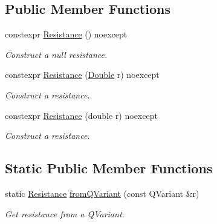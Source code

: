 \subsection*{Public Member Functions}
\begin{DoxyCompactItemize}
\item 
constexpr \hyperlink{class_mdt_1_1_numeric_1_1_resistance_ad1f9115eeae7bb01b54e79d036b2c6f9}{Resistance} () noexcept\hypertarget{class_mdt_1_1_numeric_1_1_resistance_ad1f9115eeae7bb01b54e79d036b2c6f9}{}\label{class_mdt_1_1_numeric_1_1_resistance_ad1f9115eeae7bb01b54e79d036b2c6f9}

\begin{DoxyCompactList}\small\item\em Construct a null resistance. \end{DoxyCompactList}\item 
constexpr \hyperlink{class_mdt_1_1_numeric_1_1_resistance_aab313a78dbace4ea659e49c4353b53dc}{Resistance} (\hyperlink{class_mdt_1_1_numeric_1_1_double}{Double} r) noexcept\hypertarget{class_mdt_1_1_numeric_1_1_resistance_aab313a78dbace4ea659e49c4353b53dc}{}\label{class_mdt_1_1_numeric_1_1_resistance_aab313a78dbace4ea659e49c4353b53dc}

\begin{DoxyCompactList}\small\item\em Construct a resistance. \end{DoxyCompactList}\item 
constexpr \hyperlink{class_mdt_1_1_numeric_1_1_resistance_aec246aaa432d9d2985fa4bbfcb81abfb}{Resistance} (double r) noexcept\hypertarget{class_mdt_1_1_numeric_1_1_resistance_aec246aaa432d9d2985fa4bbfcb81abfb}{}\label{class_mdt_1_1_numeric_1_1_resistance_aec246aaa432d9d2985fa4bbfcb81abfb}

\begin{DoxyCompactList}\small\item\em Construct a resistance. \end{DoxyCompactList}\end{DoxyCompactItemize}
\subsection*{Static Public Member Functions}
\begin{DoxyCompactItemize}
\item 
static \hyperlink{class_mdt_1_1_numeric_1_1_resistance}{Resistance} \hyperlink{class_mdt_1_1_numeric_1_1_resistance_af2f9019a15179e5e7c13cd31b431c740}{from\+Q\+Variant} (const Q\+Variant \&r)
\begin{DoxyCompactList}\small\item\em Get resistance from a Q\+Variant. \end{DoxyCompactList}\end{DoxyCompactItemize}


